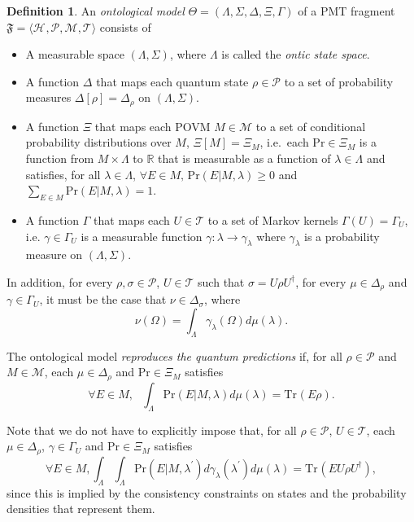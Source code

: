 \documentclass[DIV=calc,fontsize=12pt]{scrartcl} %
\theoremstyle{definition}
\newtheorem{definition}{Definition}[section]
\theoremstyle{plain}
\newcommand{\Hilb}[1][]{\ensuremath{\mathcal{H}_{#1}}}
\newcommand{\Tr}[2][]{\ensuremath{\text{Tr}_{#1} \left ( #2 \right )}}
\begin{document}
\begin{definition}
\label{def:Dyn:OM}
An \emph{ontological model} $\Theta = (\Lambda, \Sigma, \Delta, \Xi,
\Gamma)$ of a PMT fragment $\mathfrak{F} = \langle \Hilb,
\mathcal{P}, \mathcal{M}, \mathcal{T} \rangle$ consists of
\begin{itemize}
\item A measurable space $(\Lambda, \Sigma)$, where $\Lambda$ is
called the \emph{ontic state space}.
\item A function $\Delta$ that maps each quantum state $\rho \in
\mathcal{P}$ to a set of probability measures $\Delta[\rho] =
\Delta_{\rho}$ on $(\Lambda,\Sigma)$.
\item A function $\Xi$ that maps each POVM $M \in \mathcal{M}$ to a
set of conditional probability distributions over $M$, $\Xi[M] =
\Xi_M$, i.e.\ each $\text{Pr} \in \Xi_M$ is a function from $M
\times \Lambda$ to $\mathbb{R}$ that is measurable as a function
of $\lambda \in \Lambda$ and satisfies, for all $\lambda \in
\Lambda$,
$\forall E \in M, \,\text{Pr}(E|M,\lambda) \geq 0$
and $\sum_{E \in M} \text{Pr}(E|M,\lambda) = 1$.
\item A function $\Gamma$ that maps each $U \in \mathcal{T}$ to a
set of Markov kernels $\Gamma(U) = \Gamma_U$, i.e.  $\gamma \in
\Gamma_U$ is a measurable function $\gamma:\lambda \rightarrow
\gamma_{\lambda}$ where $\gamma_{\lambda}$ is a probability
measure on $(\Lambda,\Sigma)$.
\end{itemize}

In addition, for every $\rho, \sigma \in \mathcal{P}$, $U \in
\mathcal{T}$ such that $\sigma = U \rho U^{\dagger}$, for every $\mu
\in \Delta_{\rho}$ and $\gamma \in \Gamma_U$, it must be the case
that $\nu \in \Delta_{\sigma}$, where
\begin{equation}
\nu(\Omega) = \int_{\Lambda} \gamma_{\lambda}(\Omega) d\mu(\lambda).
\end{equation}

The ontological model \emph{reproduces the quantum predictions} if,
for all $\rho \in \mathcal{P}$ and $M \in \mathcal{M}$, each $\mu
\in \Delta_{\rho}$ and $\text{Pr} \in \Xi_M$ satisfies
\begin{equation}
\label{eq:Dyn:Rep2}
\forall E \in M, \,\,\,\, \int_{\Lambda} \text{Pr}(E|M,\lambda) d
\mu(\lambda) = \Tr{E \rho}.
\end{equation}
\end{definition}

Note that we do not have to explicitly impose that, for all $\rho \in
\mathcal{P}$, $U \in \mathcal{T}$, each $\mu \in \Delta_{\rho}$,
$\gamma \in \Gamma_U$ and $\text{Pr} \in \Xi_M$ satisfies
\begin{equation}
\forall E \in M,\int_{\Lambda}\int_{\Lambda} \text{Pr}(E|M,\lambda^{\prime}) d
\gamma_{\lambda}(\lambda^{\prime}) d \mu(\lambda) = \Tr{E U \rho
U^{\dagger}},
\end{equation}
since this is implied by the consistency constraints on states and the
probability densities that represent them.
\end{document}
